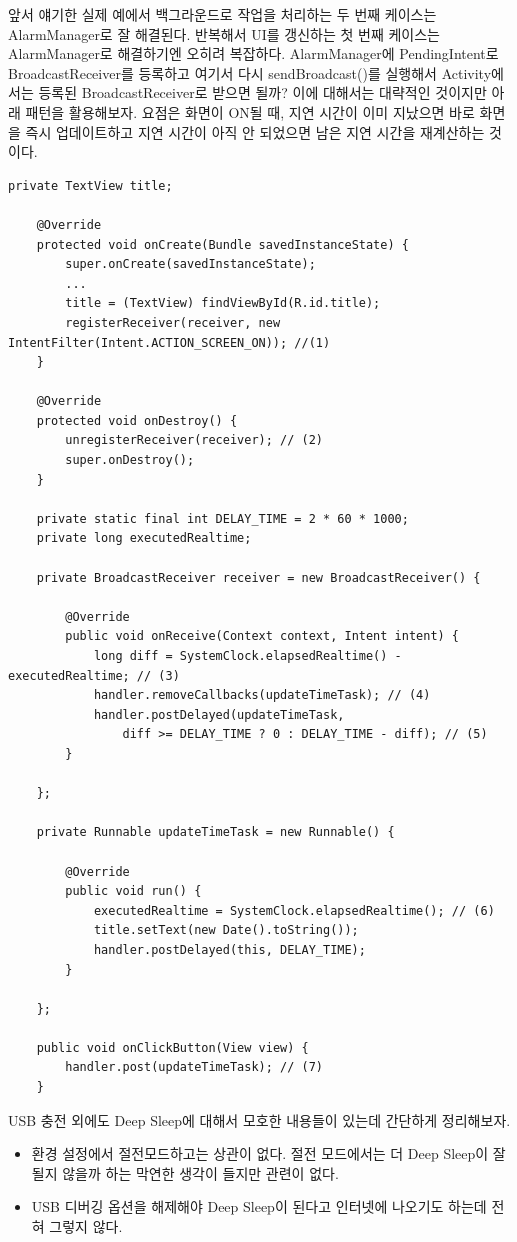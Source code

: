 앞서 얘기한 실제 예에서 백그라운드로 작업을 처리하는 두 번째 케이스는 AlarmManager로 잘 해결된다. 반복해서 UI를 갱신하는 첫 번째 케이스는 AlarmManager로 해결하기엔 오히려 복잡하다. 
AlarmManager에 PendingIntent로 BroadcastReceiver를 등록하고 여기서 다시 sendBroadcast()를 실행해서 Activity에서는 등록된 BroadcastReceiver로 받으면 될까?
이에 대해서는 대략적인 것이지만 아래 패턴을 활용해보자. 
요점은 화면이 ON될 때, 지연 시간이 이미 지났으면 바로 화면을 즉시 업데이트하고 지연 시간이 아직 안 되었으면 남은 지연 시간을 재계산하는 것이다.
\begin{lstlisting}[frame=single]
	private TextView title;

    @Override
    protected void onCreate(Bundle savedInstanceState) {
        super.onCreate(savedInstanceState);
        ...
		title = (TextView) findViewById(R.id.title);
		registerReceiver(receiver, new IntentFilter(Intent.ACTION_SCREEN_ON)); //(1)
    }
    
    @Override
	protected void onDestroy() {
		unregisterReceiver(receiver); // (2)
		super.onDestroy();
	}
	
	private static final int DELAY_TIME = 2 * 60 * 1000;
	private long executedRealtime;

	private BroadcastReceiver receiver = new BroadcastReceiver() {

		@Override
		public void onReceive(Context context, Intent intent) {
			long diff = SystemClock.elapsedRealtime() - executedRealtime; // (3)
			handler.removeCallbacks(updateTimeTask); // (4)
			handler.postDelayed(updateTimeTask, 
				diff >= DELAY_TIME ? 0 : DELAY_TIME - diff); // (5)
		}

	};

	private Runnable updateTimeTask = new Runnable() {

		@Override
		public void run() {
			executedRealtime = SystemClock.elapsedRealtime(); // (6)
			title.setText(new Date().toString());
			handler.postDelayed(this, DELAY_TIME);
		}

	};

	public void onClickButton(View view) {
		handler.post(updateTimeTask); // (7)
	}
\end{lstlisting}


USB 충전 외에도 Deep Sleep에 대해서 모호한 내용들이 있는데 간단하게 정리해보자.
\begin{itemize}
\item 환경 설정에서 절전모드하고는 상관이 없다. 절전 모드에서는 더 Deep Sleep이 잘 될지 않을까 하는 막연한 생각이 들지만 관련이 없다.
\item USB 디버깅 옵션을 해제해야 Deep Sleep이 된다고 인터넷에 나오기도 하는데 전혀 그렇지 않다.
\end{itemize}

